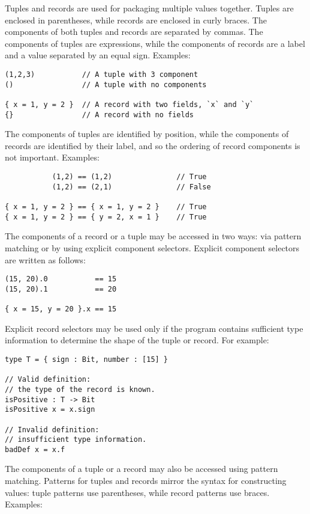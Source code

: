Tuples and records are used for packaging multiple values together.
Tuples are enclosed in parentheses, while records are enclosed in
curly braces. The components of both tuples and records are separated by
commas. The components of tuples are expressions, while the components
of records are a label and a value separated by an equal sign. Examples:

\begin{verbatim}
(1,2,3)           // A tuple with 3 component
()                // A tuple with no components

{ x = 1, y = 2 }  // A record with two fields, `x` and `y`
{}                // A record with no fields
\end{verbatim}

The components of tuples are identified by position, while the
components of records are identified by their label, and so the ordering
of record components is not important. Examples:

\begin{verbatim}
           (1,2) == (1,2)               // True
           (1,2) == (2,1)               // False

{ x = 1, y = 2 } == { x = 1, y = 2 }    // True
{ x = 1, y = 2 } == { y = 2, x = 1 }    // True
\end{verbatim}

The components of a record or a tuple may be accessed in two ways: via
pattern matching or by using explicit component selectors. Explicit
component selectors are written as follows:

\begin{verbatim}
(15, 20).0           == 15
(15, 20).1           == 20

{ x = 15, y = 20 }.x == 15
\end{verbatim}

Explicit record selectors may be used only if the program contains
sufficient type information to determine the shape of the tuple or
record. For example:

\begin{verbatim}
type T = { sign : Bit, number : [15] }

// Valid definition:
// the type of the record is known.
isPositive : T -> Bit
isPositive x = x.sign

// Invalid definition:
// insufficient type information.
badDef x = x.f
\end{verbatim}

The components of a tuple or a record may also be accessed using pattern
matching. Patterns for tuples and records mirror the syntax for
constructing values: tuple patterns use parentheses, while record
patterns use braces. Examples:


